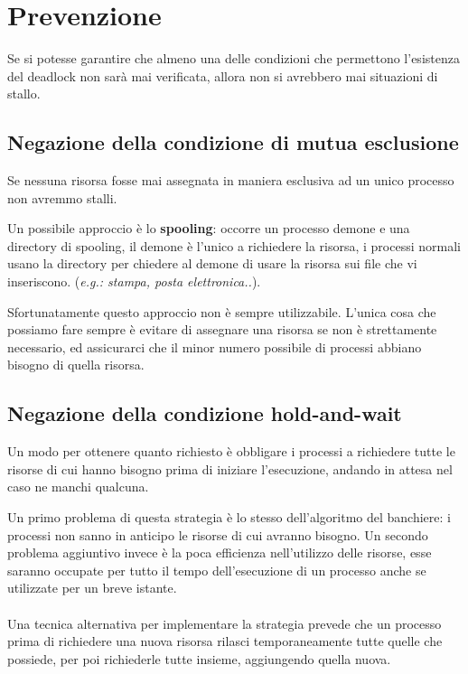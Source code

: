 \paragraph*{}
\section{Prevenzione}
Se si potesse garantire che almeno una delle condizioni che permettono l'esistenza del deadlock non sarà mai verificata, allora non si avrebbero mai situazioni di stallo.

\subsection{Negazione della condizione di mutua esclusione}
Se nessuna risorsa fosse mai assegnata in maniera esclusiva ad un unico processo non avremmo stalli.

Un possibile approccio è lo \textbf{spooling}: occorre un processo demone e una directory di spooling, il demone è l'unico a richiedere la risorsa, i processi normali usano la directory per chiedere al demone di usare la risorsa sui file che vi inseriscono. (\textit{e.g.: stampa, posta elettronica..}).

Sfortunatamente questo approccio non è sempre utilizzabile. L'unica cosa che possiamo fare sempre è evitare di assegnare una risorsa se non è strettamente necessario, ed assicurarci che il minor numero possibile di processi abbiano bisogno di quella risorsa.


\subsection{Negazione della condizione hold-and-wait}
Un modo per ottenere quanto richiesto è obbligare i processi a richiedere tutte le risorse di cui hanno bisogno prima di iniziare l'esecuzione, andando in attesa nel caso ne manchi qualcuna.

Un primo problema di questa strategia è lo stesso dell'algoritmo del banchiere: i processi non sanno in anticipo le risorse di cui avranno bisogno. Un secondo problema aggiuntivo invece è la poca efficienza nell'utilizzo delle risorse, esse saranno occupate per tutto il tempo dell'esecuzione di un processo anche se utilizzate per un breve istante.

\paragraph*{}
Una tecnica alternativa per implementare la strategia prevede che un processo prima di richiedere una nuova risorsa rilasci temporaneamente tutte quelle che possiede, per poi richiederle tutte insieme, aggiungendo quella nuova.



